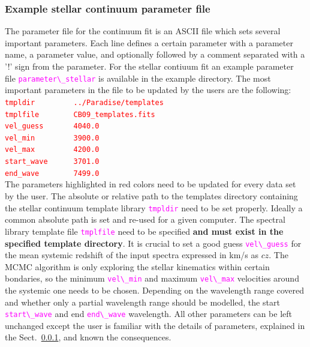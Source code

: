 \documentclass[usenatbib,usegraphicx,useAMS,onecolumn]{mn2e}
\newcommand{\codeline}[1]{\lstinline|#1|}
\newcommand{\fname}[1]{\textcolor{magenta}{\codeline{#1}}}
\begin{document}
\subsubsection{Example stellar continuum parameter file}
The parameter file for the continuum fit is an ASCII file which sets several important parameters. Each line defines a certain parameter with a parameter name,  a parameter value, and optionally followed by a comment separated with a '!' sign from the parameter. For the stellar contiuum fit an example parameter file \fname{parameter\_stellar} is available in the example directory. The most important parameters in the file to be updated by the users are the following:\bigskip\\
\textcolor{red}{\codeline{tmpldir         ../Paradise/templates}}\\
\textcolor{red}{\codeline{tmplfile        CB09_templates.fits}}\\   
\textcolor{red}{\codeline{vel_guess       4040.0}}\\ 
\textcolor{red}{\codeline{vel_min         3900.0}}\\
\textcolor{red}{\codeline{vel_max         4200.0}}\\ 
\textcolor{red}{\codeline{start_wave      3701.0}}\\  
\textcolor{red}{\codeline{end_wave        7499.0}}\\  

The parameters highlighted in red colors need to be updated for every data set by the user. The absolute or relative path to the templates directory containing the stellar continuum template library \fname{tmpldir} need to be set properly. Ideally a common absolute path is set and re-used for a given computer. The spectral library template file \fname{tmplfile} need to be specified \textbf{and must exist in the specified template directory}. It is crucial to set a good guess \fname{vel\_guess} for the mean systemic redshift of the input spectra expressed in km/s as $cz$. The MCMC algorithm is only exploring the stellar kinematics within certain bondaries, so the minimum \fname{vel\_min} and maximum \fname{vel\_max} velocities around the systemic one needs to be chosen. Depending on the wavelength range covered and whether only a partial wavelength range should be modelled, the start \fname{start\_wave} and end \fname{end\_wave} wavelength. All other parameters can be left unchanged except the user is familiar with the details of parameters, explained in the Sect.~\ref{}, and known the consequences.
\end{document}
